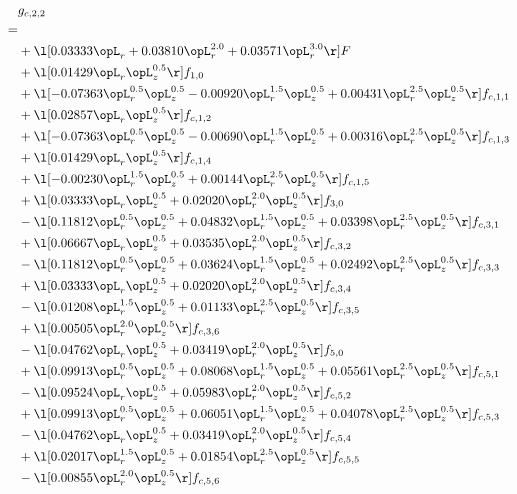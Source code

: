 \begin{alignat}{2} 
\label{eq:g_22_0} 
& g_{c,2,2} \nonumber \\ 
 = \\ 
& + \l[  0.03333 \opL_r +  0.03810 \opL_r^{2.0} +  0.03571 \opL_r^{3.0}  \r] F \nonumber \\ 
& + \l[  0.01429 \opL_r \opL_z^{0.5}  \r] f_{1,0} \nonumber \\ 
& + \l[  -0.07363 \opL_r^{0.5} \opL_z^{0.5}   -0.00920 \opL_r^{1.5} \opL_z^{0.5} +  0.00431 \opL_r^{2.5} \opL_z^{0.5}  \r] f_{c,1,1} \nonumber \\ 
& + \l[  0.02857 \opL_r \opL_z^{0.5}  \r] f_{c,1,2} \nonumber \\ 
& + \l[  -0.07363 \opL_r^{0.5} \opL_z^{0.5}   -0.00690 \opL_r^{1.5} \opL_z^{0.5} +  0.00316 \opL_r^{2.5} \opL_z^{0.5}  \r] f_{c,1,3} \nonumber \\ 
& + \l[  0.01429 \opL_r \opL_z^{0.5}  \r] f_{c,1,4} \nonumber \\ 
& + \l[  -0.00230 \opL_r^{1.5} \opL_z^{0.5} +  0.00144 \opL_r^{2.5} \opL_z^{0.5}  \r] f_{c,1,5} \nonumber \\ 
& + \l[  0.03333 \opL_r \opL_z^{0.5} +  0.02020 \opL_r^{2.0} \opL_z^{0.5}  \r] f_{3,0} \nonumber \\ 
& - \l[  0.11812 \opL_r^{0.5} \opL_z^{0.5} +  0.04832 \opL_r^{1.5} \opL_z^{0.5} +  0.03398 \opL_r^{2.5} \opL_z^{0.5}  \r] f_{c,3,1} \nonumber \\ 
& + \l[  0.06667 \opL_r \opL_z^{0.5} +  0.03535 \opL_r^{2.0} \opL_z^{0.5}  \r] f_{c,3,2} \nonumber \\ 
& - \l[  0.11812 \opL_r^{0.5} \opL_z^{0.5} +  0.03624 \opL_r^{1.5} \opL_z^{0.5} +  0.02492 \opL_r^{2.5} \opL_z^{0.5}  \r] f_{c,3,3} \nonumber \\ 
& + \l[  0.03333 \opL_r \opL_z^{0.5} +  0.02020 \opL_r^{2.0} \opL_z^{0.5}  \r] f_{c,3,4} \nonumber \\ 
& - \l[  0.01208 \opL_r^{1.5} \opL_z^{0.5} +  0.01133 \opL_r^{2.5} \opL_z^{0.5}  \r] f_{c,3,5} \nonumber \\ 
& + \l[  0.00505 \opL_r^{2.0} \opL_z^{0.5}  \r] f_{c,3,6} \nonumber \\ 
& - \l[  0.04762 \opL_r \opL_z^{0.5} +  0.03419 \opL_r^{2.0} \opL_z^{0.5}  \r] f_{5,0} \nonumber \\ 
& + \l[  0.09913 \opL_r^{0.5} \opL_z^{0.5} +  0.08068 \opL_r^{1.5} \opL_z^{0.5} +  0.05561 \opL_r^{2.5} \opL_z^{0.5}  \r] f_{c,5,1} \nonumber \\ 
& - \l[  0.09524 \opL_r \opL_z^{0.5} +  0.05983 \opL_r^{2.0} \opL_z^{0.5}  \r] f_{c,5,2} \nonumber \\ 
& + \l[  0.09913 \opL_r^{0.5} \opL_z^{0.5} +  0.06051 \opL_r^{1.5} \opL_z^{0.5} +  0.04078 \opL_r^{2.5} \opL_z^{0.5}  \r] f_{c,5,3} \nonumber \\ 
& - \l[  0.04762 \opL_r \opL_z^{0.5} +  0.03419 \opL_r^{2.0} \opL_z^{0.5}  \r] f_{c,5,4} \nonumber \\ 
& + \l[  0.02017 \opL_r^{1.5} \opL_z^{0.5} +  0.01854 \opL_r^{2.5} \opL_z^{0.5}  \r] f_{c,5,5} \nonumber \\ 
& - \l[  0.00855 \opL_r^{2.0} \opL_z^{0.5}  \r] f_{c,5,6} \nonumber \\ 
\end{alignat} 


